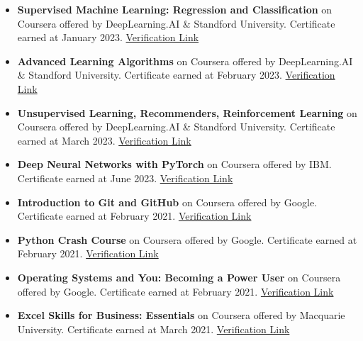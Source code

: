 \documentclass[letterpaper, 12pt]{article}
\begin{document}
	\begin{itemize}[leftmargin=*]
		
	\item \textbf{Supervised Machine Learning: Regression and Classification} on Coursera offered by DeepLearning.AI \& Standford University. Certificate earned at January 2023. \href{https://www.coursera.org/account/accomplishments/certificate/VD8VT99H89J5}{Verification Link}
	
	\item \textbf{Advanced Learning Algorithms} on Coursera offered by DeepLearning.AI \& Standford University. Certificate earned at February 2023. \href{https://www.coursera.org/account/accomplishments/certificate/7PRNGGJZ7YBR}{Verification Link}
	
	\item \textbf{Unsupervised Learning, Recommenders, Reinforcement Learning} on Coursera offered by DeepLearning.AI \& Standford University. Certificate earned at March 2023. \href{https://www.coursera.org/account/accomplishments/certificate/CTH6L4SBUL7S}{Verification Link}
	
	\item \textbf{Deep Neural Networks with PyTorch} on Coursera offered by IBM. Certificate earned at June 2023. \href{https://www.coursera.org/account/accomplishments/certificate/VW9E3WQXYPJ9}{Verification Link}
	
	\item \textbf{Introduction to Git and GitHub} on Coursera offered by Google. Certificate earned at February 2021. \href{https://www.coursera.org/account/accomplishments/certificate/3H3N24N688CQ}{Verification Link}
	
	\item \textbf{Python Crash Course} on Coursera offered by Google. Certificate earned at February 2021. \href{https://www.coursera.org/account/accomplishments/certificate/ULTQVPQLDMZU}{Verification Link}
	
	\item \textbf{Operating Systems and You: Becoming a Power User} on Coursera offered by Google. Certificate earned at February 2021. \href{https://www.coursera.org/account/accomplishments/certificate/3N5CTQHU47X3}{Verification Link}
	
	\item \textbf{Excel Skills for Business: Essentials} on Coursera offered by Macquarie University. Certificate earned at March 2021. \href{https://www.coursera.org/account/accomplishments/certificate/7DPNK2A4CHMX}{Verification Link}
	
	\end{itemize}
	
\end{document}
